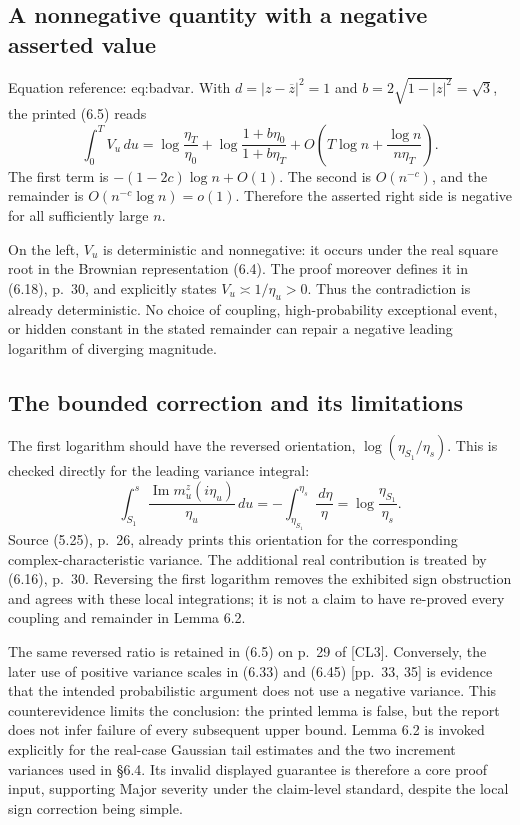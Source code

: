 \documentclass[10pt]{article}
\begin{document}
\subsection*{A nonnegative quantity with a negative asserted value}
Equation reference: eq:badvar. With \(d=|z-\overline z|^2=1\) and \(b=2\sqrt{1-|z|^2}=\sqrt3\), the printed (6.5) reads \[
 \int_0^T V_u\,du
 =\log\frac{\eta_T}{\eta_0}
  +\log\frac{1+b\eta_0}{1+b\eta_T}
  +O\left(T\log n+\frac{\log n}{n\eta_T}\right).\] The first term is \(-(1-2c)\log n+O(1)\). The second is \(O(n^{-c})\), and the remainder is \(O(n^{-c}\log n)=o(1)\). Therefore the asserted right side is negative for all sufficiently large \(n\).\par
On the left, \(V_u\) is deterministic and nonnegative: it occurs under the real square root in the Brownian representation (6.4). The proof moreover defines it in (6.18), p. 30, and explicitly states \(V_u\asymp1/\eta_u>0\). Thus the contradiction is already deterministic. No choice of coupling, high-probability exceptional event, or hidden constant in the stated remainder can repair a negative leading logarithm of diverging magnitude.\par
\subsection*{The bounded correction and its limitations}
The first logarithm should have the reversed orientation, \(\log(\eta_{S_1}/\eta_s)\). This is checked directly for the leading variance integral: \[\int_{S_1}^s
      \frac{\operatorname{Im}m_u^z(i\eta_u)}{\eta_u}\,du
   =-\int_{\eta_{S_1}}^{\eta_s}\frac{\,d\eta}{\eta}
   =\log\frac{\eta_{S_1}}{\eta_s}.\] Source (5.25), p. 26, already prints this orientation for the corresponding complex-characteristic variance. The additional real contribution is treated by (6.16), p. 30. Reversing the first logarithm removes the exhibited sign obstruction and agrees with these local integrations; it is not a claim to have re-proved every coupling and remainder in Lemma 6.2.\par
The same reversed ratio is retained in (6.5) on p. 29 of [CL3]. Conversely, the later use of positive variance scales in (6.33) and (6.45) [pp. 33, 35] is evidence that the intended probabilistic argument does not use a negative variance. This counterevidence limits the conclusion: the printed lemma is false, but the report does not infer failure of every subsequent upper bound. Lemma 6.2 is invoked explicitly for the real-case Gaussian tail estimates and the two increment variances used in §6.4. Its invalid displayed guarantee is therefore a core proof input, supporting Major severity under the claim-level standard, despite the local sign correction being simple.\par
\end{document}

